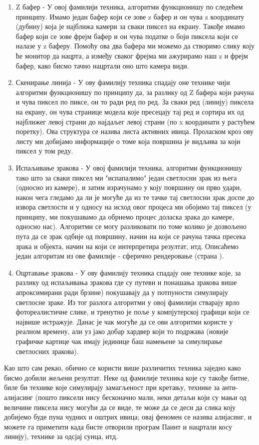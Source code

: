 \documentclass[12pt]{article}
\begin{document}
	\begin{enumerate}
	\item Z бафер - У овој фамилији техника, алгоритми функционишу по следећем принципу. Имамо један бафер који се зове z бафер и он чува z координату (дубину) која је најближа камери за сваки пиксел на екрану. Такође имамо бафер који се зове фрејм бафер и он чува податке о боји пиксела који се налазе у z баферу. Помоћу ова два бафера ми можемо да створимо слику коју ће монитор да нацрта, а између сваког фрејма ми ажурирамо наш z и фрејм бафер, како бисмо тачно нацртали оно што камера види.
	\item Скенирање линија - У ову фамилију техника спадају оне технике чији алгоритми функционишу по принципу да, за разлику од Z бафера који рачуна и чува пиксел по пиксе, он то ради ред по ред. За сваки ред (линију) пиксела на екрану, он чува странице модела које пресецају тај ред и сортира их од најближег левој страни до најдаљег левој страни (по x координати у растућем поретку). Ова структура се назива листа активних ивица. Проласком кроз ову листу ми добијамо информације о томе која површина је видљива за који пиксел у том реду.
	\item Испаљивање зракова - У овој фамилији техника, алгоритми функционишу тако што за сваки пиксел ми "испапалимо" један светлосни зрак из њега (односно из камере), и затим израчунамо у коју површину он прво удари, након чега гледамо да ли је могуће да из те тачке тај светлосни зрак доспе до извора светлости и у односу на исход овог процеса ми обојимо тај пиксел (у принципу, ми покушавамо да обрнемо процес доласка зрака до камере, односно нас). Алгоритми се могу разликовати по томе колико је дозвољено пута да се зрак одбије од површину, начин на који се рачуна тачка пресека зрака и објекта, начин на који се интерпретира резултат, итд. Описаћемо један алгоритам из ове фамилије - сферично рендеровање (страна \pageref{sfericnorenderovanje}).
	\item Оцртавање зракова - У ову фамилију техника спадају оне технике које, за разлику од испаљивања зракова где су путеви и понашања зракова више апроксимирани ради брзине) покушавају да у потпуности симулирају светлосне зраке. Из тог разлога алгоритми у овој фамилији стварају врло фотореалистичне слике, и тренутно је поље у компјутерској графици који се највише истражује. Данас је чак могуће да се ови алгоритми користе у реалном времену, али уз јако добар хардвер који то подржава (новије графичке картице чак имају јединице баш намењене за симулирање светлосних зракова).
	\end{enumerate}
	Као што сам рекао, обично се користи више различитих техника заједно како бисмо добили жељени резултат. Неке од фамилије техника које су такође битне, биле би технике које симулирају замагљеност при кретању, технике за анти-алијасинг (пошто пиксели нису бесконачно мали, неки детаљи који су мањи од величине пиксела нису могући да се виде, те може да се деси да слика коју добијемо буде пуна чудних и оштрих ивица; овај феномен се назива алијасинг, и можете га приметити када бисте отворили програм Паинт и нацртали косу линију), технике за одсјај сунца, итд.
	
\end{document}
